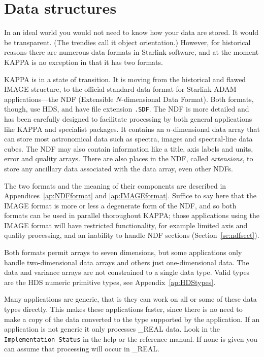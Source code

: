 \newpage
\section{Data structures}
\label{se:datastr}
In an ideal world you would not need to know how your data are stored.
It would be transparent. (The trendies call it object orientation.) 
However, for historical reasons there are numerous data formats in
Starlink software, and at the moment {\small KAPPA} is no exception in
that it has two formats. 

{\small KAPPA} is in a state of transition.  It is moving from the
historical and flawed IMAGE structure, to the official standard data
format for Starlink {\small ADAM} applications---the NDF (Extensible
$N$-dimensional Data Format).  Both formats, though, use HDS, and have
file extension {\tt .SDF}.  The NDF is more detailed and has been
carefully designed to facilitate processing by both general applications
like {\small KAPPA} and specialist packages.  It contains an
$n$-dimensional data array that can store most astronomical data such as
spectra, images and spectral-line data cubes. The NDF may also contain
information like a title, axis labels and units, error and quality
arrays.  There are also places in the NDF, called {\em extensions}, to
store any ancillary data associated with the data array, even other
NDFs.

The two formats and the meaning of their components are described in
Appendices~\ref{ap:NDFformat} and \ref{ap:IMAGEformat}.   Suffice to say
here that the IMAGE format is more or less a degenerate form of the NDF,
and so both formats can be used in parallel thoroughout {\small KAPPA};
those applications using the IMAGE format will have restricted
functionality, for example limited axis and quality processing, and an
inability to handle NDF sections (Section~\ref{se:ndfsect}).

Both formats permit arrays to seven dimensions, but some
applications only handle two-dimen\-sional data arrays and others just
one-dimensional data.  The data and variance arrays are not constrained
to a single data type. Valid types are the HDS numeric primitive types, see
Appendix~\ref{ap:HDStypes}.

Many applications are generic, that is they can work on all or some of
these data types directly.  This makes these applications faster, since
there is no need to make a copy of the data converted to the type
supported by the application.  If an application is not generic it only
processes {\_REAL} data.   Look in the {\tt Implementation Status} in
the help or the reference manual.  If none is given you can assume that
processing will occur in \_REAL.

